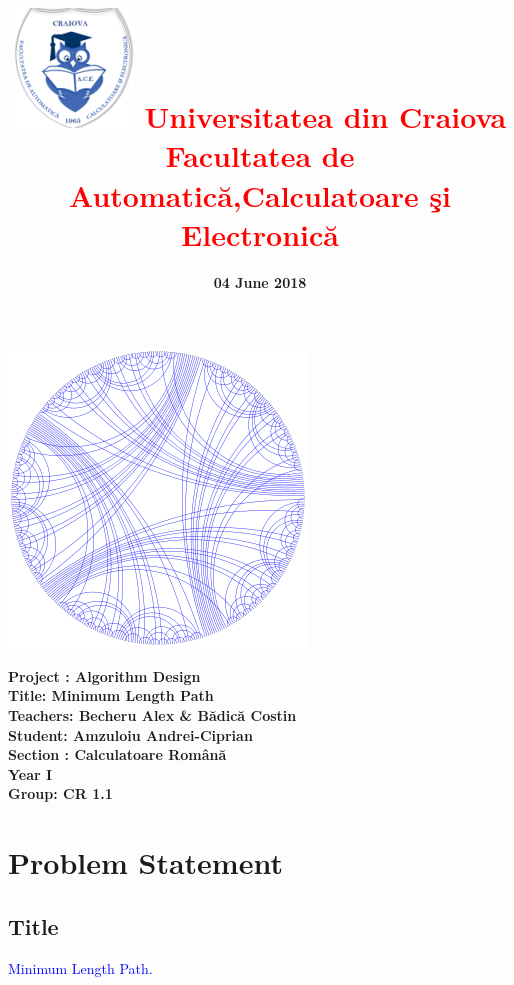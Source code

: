 \documentclass[12]{article}
\begin{document}
\title{\textbf{\includegraphics[scale=0.5]{42.png}
\textcolor{red}{Universitatea din Craiova \\Facultatea de Automatic\u{a},Calculatoare \c{s}i Electronic\u{a}}}}
\date{\textbf{04 June 2018}}
\maketitle
\begin{center}
\includegraphics[scale=0.7]{cover_graph.png}
\end{center}
\textbf{Project : Algorithm Design} \\
\textbf{Title: Minimum Length Path}\\
\textbf{Teachers: Becheru Alex \& B\u{a}dic\u{a} Costin}\\
\textbf{Student: Amzuloiu Andrei-Ciprian} \\
\textbf{Section : Calculatoare Rom\^{a}n\u{a}\\ Year I\\ Group: CR 1.1}
\newpage
\tableofcontents

\newpage
\section{Problem Statement}

\textcolor{white}{}
\subsection{Title}
         \textcolor{blue}    {Minimum Length Path.}
\end{document}
